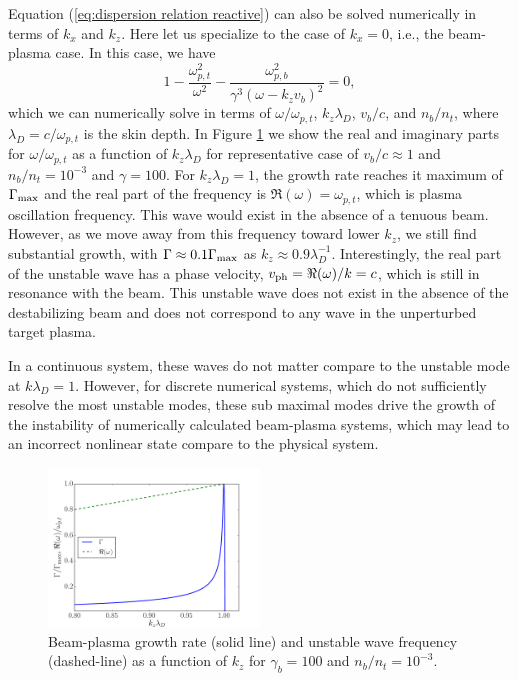 \documentclass[usenatbib,iop,apj,numberedappendix]{aeb_emulateapj_2015}
\begin{document}
Equation (\ref{eq:dispersion relation reactive}) can also be solved numerically in terms of $k_x$ and $k_z$.  Here let us specialize to the case of $k_x = 0$, i.e., the beam-plasma case.  In this case, we have 
\begin{equation}\label{eq:dispersion relation beam-plasma}
 1 - \frac{\omega_{p,t}^2}{\omega^2} - \frac{\omega_{p,b}^2}{\gamma^3(\omega-k_z v_b)^2} = 0,
\end{equation}
which we can numerically solve in terms of $\omega/\omega_{p,t}$, $k_z\lambda_D$, $v_b/c$, and $n_b/n_t$, where $\lambda_D = c/\omega_{p,t}$ is the skin depth.  In Figure \ref{fig:OffResonance} we show the real and imaginary parts for $\omega/\omega_{p,t}$ as a function of $k_z\lambda_D$ for representative case of $v_b/c \approx 1$ and $n_b/n_t = 10^{-3}$ and $\gamma=100$.    For $k_z\lambda_D = 1$, the growth rate reaches it maximum of $\Gamma_{\rm max}$ and the real part of the frequency is $\Re(\omega) = \omega_{p,t}$, which is plasma oscillation frequency.  This wave would exist in the absence of a tenuous beam.  However, as we move away from this frequency toward lower $k_z$, we still find substantial growth, with $\Gamma \approx 0.1 \Gamma_{\rm max}$ as $k_z \approx 0.9\lambda_D^{-1}$.  Interestingly, the real part of the unstable wave has a phase velocity, $v_{\rm ph} = \Re(\omega)/k = c$, which is still in resonance with the beam.  This unstable wave does not exist in the absence of the destabilizing beam and does not correspond to any wave in the unperturbed target plasma.  

In a continuous system, these waves do not matter compare to the unstable mode at $k\lambda_D = 1$.   However, for discrete numerical systems, which do not sufficiently resolve the most unstable modes, these sub maximal modes drive the growth of the instability of numerically calculated beam-plasma systems, which may lead to an incorrect nonlinear state compare to the physical system.

\begin{figure}
\includegraphics[width=0.5\textwidth]{off_res.pdf}
\caption{Beam-plasma growth rate (solid line) and unstable wave frequency (dashed-line) as a function of
  $k_z$ for $\gamma_b = 100$ and $n_b/n_t=10^{-3}$. \label{fig:OffResonance}}
\end{figure}
\end{document}
